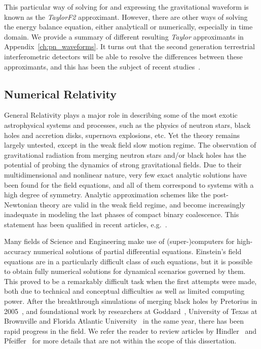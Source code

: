 
This particular way of solving for and expressing the gravitational waveform 
is known as the {\it TaylorF2} approximant. However, there are other ways
of solving the energy balance equation, either analyticall or numerically,
especially in time domain. We provide a summary of different resulting 
{\it Taylor} approximants in Appendix~\ref{ch:pn_waveforms}. It turns out 
that the second generation terrestrial interferometric detectors will be 
able to resolve the differences between these approximants, and this has been 
the subject of recent studies~\cite{Buonanno:2009zt,NRPNComparisonBoyleetal}.

\subsection{Numerical Relativity}
\label{sec:NRWaveforms}

General Relativity plays a major role in describing some of the most exotic 
astrophysical systems and processes, such as the physics of neutron stars, 
black holes and accretion disks, supernova explosions, etc. Yet the theory 
remains largely untested, except in the weak field slow motion regime. 
The observation of gravitational radiation from merging neutron stars and/or
black holes has the potential of probing the dynamics of strong gravitational
fields.
Due to their multidimensional and nonlinear nature, 
very few exact analytic solutions have been found for the field equations, 
and all of them correspond to systems with a high degree of symmetry.
Analytic approximation schemes like the post-Newtonian theory are valid in
the weak field regime, and become increasingly inadequate in 
modeling the last phases of compact binary coalescence. 
This statement has been qualified in recent articles, e.g.~\cite{Nitz:2013mxa}.

Many fields of Science and Engineering make use of (super-)computers for 
high-accuracy numerical solutions of partial differential equations. 
Einstein's field equations are in a particularly difficult class of such
equations, but it is possible to obtain fully numerical solutions for dynamical
scenarios governed by them. This proved to be a remarkably difficult task
when the first attempts were made, both due to technical and conceptual 
difficulties as well as limited computing power. After the breakthrough
simulations of merging black holes by Pretorius in 
2005~\cite{Pretorius2005}, and foundational work by researchers at 
Goddard~\cite{Campanelli:2005dd}, University of Texas at Brownville and Florida
Atlantic University~\cite{Campanelli:2005dd} in the same year, there has been
rapid progress in the field. 
We refer the reader to review articles by Hindler~\cite{Hinder:2010vn} and
Pfeiffer~\cite{Pfeiffer:2012pc} for more details that are not 
within the scope of this dissertation. 

